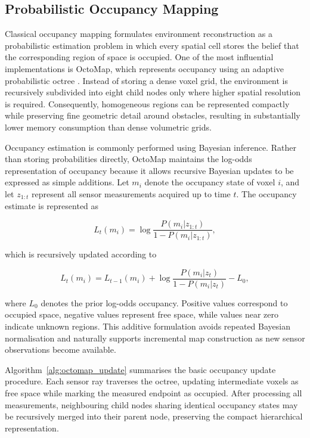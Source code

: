 \documentclass[11pt,oneside,openany]{book}
\begin{document}
\subsection{Probabilistic Occupancy Mapping}

Classical occupancy mapping formulates environment reconstruction as a probabilistic estimation problem in which every spatial cell stores the belief that the corresponding region of space is occupied. One of the most influential implementations is OctoMap, which represents occupancy using an adaptive probabilistic octree \cite{hornung2013_octomap}. Instead of storing a dense voxel grid, the environment is recursively subdivided into eight child nodes only where higher spatial resolution is required. Consequently, homogeneous regions can be represented compactly while preserving fine geometric detail around obstacles, resulting in substantially lower memory consumption than dense volumetric grids.

Occupancy estimation is commonly performed using Bayesian inference. Rather than storing probabilities directly, OctoMap maintains the log-odds representation of occupancy because it allows recursive Bayesian updates to be expressed as simple additions. Let $m_i$ denote the occupancy state of voxel $i$, and let $z_{1:t}$ represent all sensor measurements acquired up to time $t$. The occupancy estimate is represented as

\begin{equation}
L_t(m_i)
=
\log
\frac{P(m_i|z_{1:t})}
     {1-P(m_i|z_{1:t})},
\label{eq:octomap_logodds}
\end{equation}

which is recursively updated according to

\begin{equation}
L_t(m_i)
=
L_{t-1}(m_i)
+
\log
\frac{P(m_i|z_t)}
     {1-P(m_i|z_t)}
-
L_0,
\label{eq:octomap_update}
\end{equation}

where $L_0$ denotes the prior log-odds occupancy. Positive values correspond to occupied space, negative values represent free space, while values near zero indicate unknown regions. This additive formulation avoids repeated Bayesian normalisation and naturally supports incremental map construction as new sensor observations become available.

Algorithm~\ref{alg:octomap_update} summarises the basic occupancy update procedure. Each sensor ray traverses the octree, updating intermediate voxels as free space while marking the measured endpoint as occupied. After processing all measurements, neighbouring child nodes sharing identical occupancy states may be recursively merged into their parent node, preserving the compact hierarchical representation.
\end{document}
